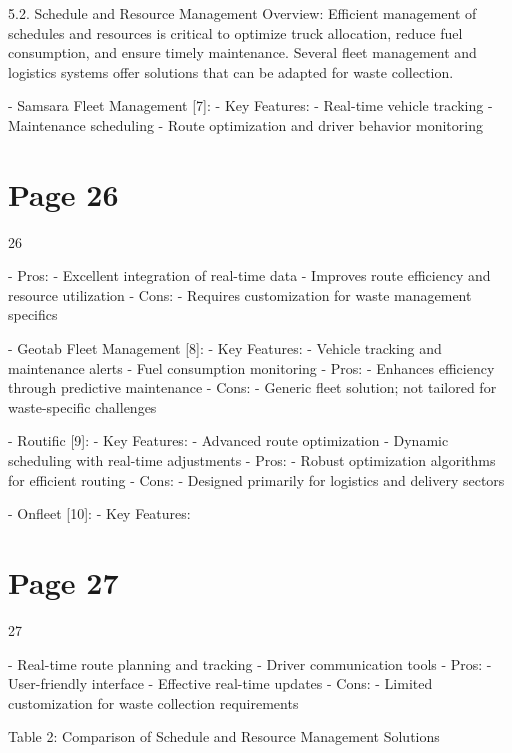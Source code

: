 \documentclass{article}
\begin{document}
5.2. Schedule and Resource Management 
Overview:   
Efficient management of schedules and resources is critical to optimize truck allocation, reduce 
fuel consumption, and ensure timely maintenance. Several fleet management and logistics 
systems offer solutions that can be adapted for waste collection. 
 
- Samsara Fleet Management [7]:   
  - Key Features:   
    - Real-time vehicle tracking   
    - Maintenance scheduling   
    - Route optimization and driver behavior monitoring   

\section*{Page 26}
   
 
 26  
 
  - Pros:   
    - Excellent integration of real-time data   
    - Improves route efficiency and resource utilization   
  - Cons:   
    - Requires customization for waste management specifics 
 
- Geotab Fleet Management [8]:   
  - Key Features:   
    - Vehicle tracking and maintenance alerts   
    - Fuel consumption monitoring   
  - Pros:   
    - Enhances efficiency through predictive maintenance   
  - Cons:   
    - Generic fleet solution; not tailored for waste-specific challenges 
 
- Routific [9]:   
  - Key Features:   
    - Advanced route optimization   
    - Dynamic scheduling with real-time adjustments   
  - Pros:   
    - Robust optimization algorithms for efficient routing   
  - Cons:   
    - Designed primarily for logistics and delivery sectors 
 
- Onfleet [10]:   
  - Key Features:   

\section*{Page 27}
   
 
 27  
 
    - Real-time route planning and tracking   
    - Driver communication tools   
  - Pros:   
    - User-friendly interface   
    - Effective real-time updates   
  - Cons:   
    - Limited customization for waste collection requirements 
 
Table 2: Comparison of Schedule and Resource Management Solutions 
 
\end{document}
